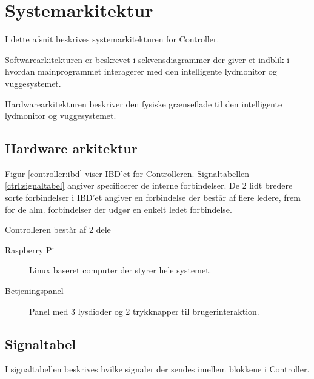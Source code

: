 \section{Systemarkitektur}

I dette afsnit beskrives systemarkitekturen for Controller.

Softwarearkitekturen er beskrevet i sekvensdiagrammer der giver et indblik i hvordan mainprogrammet interagerer med den intelligente lydmonitor og vuggesystemet.

Hardwarearkitekturen beskriver den fysiske grænseflade til den intelligente lydmonitor og vuggesystemet.



\subsection{Hardware arkitektur}


Figur \ref{controller:ibd} viser IBD'et for Controlleren. Signaltabellen \ref{ctrl:signaltabel} angiver specificerer de interne forbindelser. De 2 lidt bredere sorte forbindelser i IBD'et angiver en forbindelse der består af flere ledere, frem for de alm. forbindelser der udgør en enkelt ledet forbindelse. 

Controlleren består af 2 dele
\begin{description}
\item[Raspberry Pi] Linux baseret computer der styrer hele systemet. 
\item[Betjeningspanel] Panel med 3 lysdioder og 2 trykknapper til brugerinteraktion.
\end{description}

\newpage

\subsection{Signaltabel}

I signaltabellen beskrives hvilke signaler der sendes imellem blokkene i Controller.  

